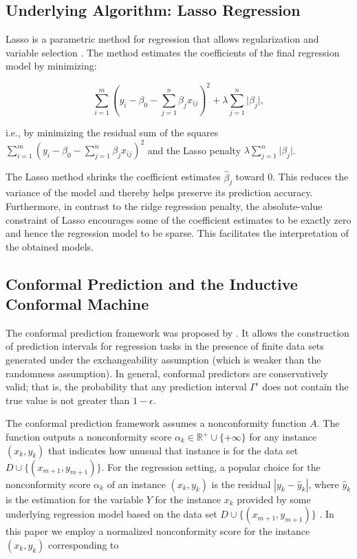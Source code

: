 \documentclass[pmlr]{jmlr}%
\begin{document}
\subsection{Underlying Algorithm: Lasso Regression}
\label{sec:lasso}

Lasso is a parametric method for regression that allows regularization and variable selection \citep{Tibshirani.1996}. The method estimates the coefficients of the final regression model by minimizing:

\[ \sum_{i = 1}^{m} ( y_i - \beta_0 - \sum_{j = 1}^{n} \beta_j x_{ij})^2 + \lambda \sum_{j = 1}^{n}\lvert\beta_j\rvert, \]

\noindent i.e., by minimizing the  residual sum of the squares $\sum_{i = 1}^{m} ( y_i - \beta_0 - \sum_{j = 1}^{n} \beta_j x_{ij})^2$ and the Lasso penalty $\lambda \sum_{j = 1}^{n}\lvert\beta_j\rvert$.

The Lasso method shrinks the coefficient estimates $\hat{\beta}_j$ toward 0. This reduces the variance of the model and thereby helps preserve its prediction accuracy. Furthermore, in contrast to the ridge regression penalty, the absolute-value constraint of Lasso encourages some of the coefficient estimates to be exactly zero and hence the regression model to be sparse. This facilitates the interpretation of the obtained models.

\subsection{Conformal Prediction and the Inductive Conformal Machine}
\label{sec:cp}

The conformal prediction framework was proposed by \citet{Vovk.2005}. It allows the construction of  prediction intervals for regression tasks in the presence of finite data sets generated under the exchangeability assumption (which is weaker than the randomness assumption). In general, conformal predictors are conservatively valid; that is, the probability that any prediction interval $\Gamma^\epsilon$ does not contain the true value is not greater than $1 - \epsilon$.

The conformal prediction framework assumes a nonconformity function $A$. The function outputs a nonconformity score $\alpha_k \in \mathbb{R}^+ \cup \{+\infty\}$ for any instance $(x_{k},y_{k})$ that indicates how unusual that instance is for the data set $D \cup \{(x_{m+1},y_{m+1})\}$. For the regression setting, a popular choice for the nonconformity score $\alpha_k$ of an instance $(x_{k},y_{k})$ is the residual $|y_k - \hat{y}_k|$, where $\hat{y}_k$ is the estimation for the variable $Y$ for the instance $x_k$ provided by some underlying regression model based on the data set $D \cup \{(x_{m+1}, y_{m+1})\}$ \citep{Papadopoulos.2002, Papadopoulos.2015}. In this paper we employ a normalized nonconformity score for the instance  $(x_{k},y_{k})$ corresponding to
\end{document}
